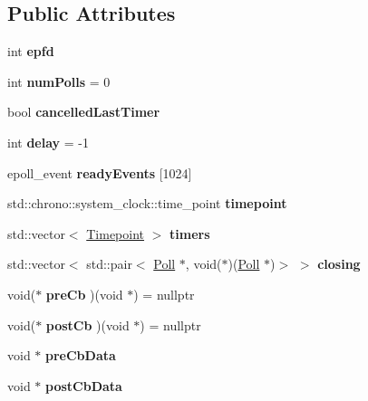 \subsection*{Public Attributes}
\begin{DoxyCompactItemize}
\item 
\mbox{\label{struct_loop_a077b987eafb8df92652644f5805d2a18}} 
int {\bfseries epfd}
\item 
\mbox{\label{struct_loop_afea5243a49f2850dc3112f33727bb21d}} 
int {\bfseries num\+Polls} = 0
\item 
\mbox{\label{struct_loop_aff667f9128bdec659ed794b7a7681eab}} 
bool {\bfseries cancelled\+Last\+Timer}
\item 
\mbox{\label{struct_loop_a72fd8d2054b50d375bdf0dc4343c3526}} 
int {\bfseries delay} = -\/1
\item 
\mbox{\label{struct_loop_a1dccc690d15c5cfaaff5966cb28c6ad4}} 
epoll\+\_\+event {\bfseries ready\+Events} \mbox{[}1024\mbox{]}
\item 
\mbox{\label{struct_loop_a500ad2e79ebc1f24e395b3bd65e02959}} 
std\+::chrono\+::system\+\_\+clock\+::time\+\_\+point {\bfseries timepoint}
\item 
\mbox{\label{struct_loop_a11f8229ab398d876a31d6013624c41d3}} 
std\+::vector$<$ \mbox{\hyperlink{struct_timepoint}{Timepoint}} $>$ {\bfseries timers}
\item 
\mbox{\label{struct_loop_ad40c991d48075dee0964b84d1d0368d4}} 
std\+::vector$<$ std\+::pair$<$ \mbox{\hyperlink{struct_poll}{Poll}} $\ast$, void($\ast$)(\mbox{\hyperlink{struct_poll}{Poll}} $\ast$)$>$ $>$ {\bfseries closing}
\item 
\mbox{\label{struct_loop_a710414a00809103997df767407b88b41}} 
void($\ast$ {\bfseries pre\+Cb} )(void $\ast$) = nullptr
\item 
\mbox{\label{struct_loop_a547efe453e2ed50f459505c5bba4f95d}} 
void($\ast$ {\bfseries post\+Cb} )(void $\ast$) = nullptr
\item 
\mbox{\label{struct_loop_a012a840c9d70042d9798c388549e74d7}} 
void $\ast$ {\bfseries pre\+Cb\+Data}
\item 
\mbox{\label{struct_loop_a5d71f572548faedd2b0b558bb1795f37}} 
void $\ast$ {\bfseries post\+Cb\+Data}
\end{DoxyCompactItemize}


